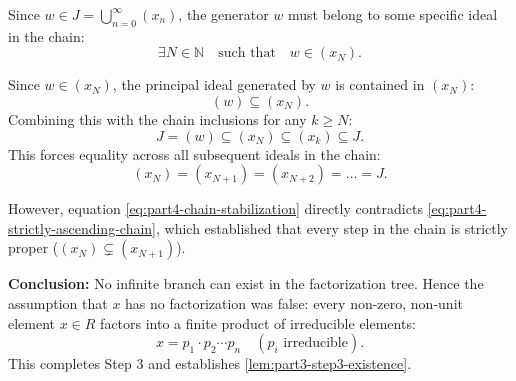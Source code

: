 \begin{proofWrapper}
\begin{content}
Since $w \in J = \bigcup_{n=0}^\infty (x_n)$, the generator $w$ must belong to some specific ideal in the chain:
\begin{equation}\label{eq:part4-w-in-specific-xn}
\exists N \in \mathbb{N} \quad \text{such that} \quad w \in (x_N).
\end{equation}

Since $w \in (x_N)$, the principal ideal generated by $w$ is contained in $(x_N)$:
\[
(w) \subseteq (x_N).
\]
Combining this with the chain inclusions for any $k \ge N$:
\begin{equation}\label{eq:part4-collapse-chain}
J = (w) \subseteq (x_N) \subseteq (x_k) \subseteq J.
\end{equation}
This forces equality across all subsequent ideals in the chain:
\begin{equation}\label{eq:part4-chain-stabilization}
(x_N) = (x_{N+1}) = (x_{N+2}) = \dots = J.
\end{equation}

However, equation \eqref{eq:part4-chain-stabilization} directly contradicts \eqref{eq:part4-strictly-ascending-chain}, which established that every step in the chain is strictly proper ($(x_N) \subsetneq (x_{N+1})$).

\textbf{Conclusion:} No infinite branch can exist in the factorization tree. Hence the assumption that $x$ has no factorization was false: every non-zero, non-unit element $x \in R$ factors into a finite product of irreducible elements:
\[
x = p_1 \cdot p_2 \cdots p_n \quad (p_i \text{ irreducible}).
\]
This completes Step 3 and establishes \cref{lem:part3-step3-existence}.
\end{content}
\end{proofWrapper}

